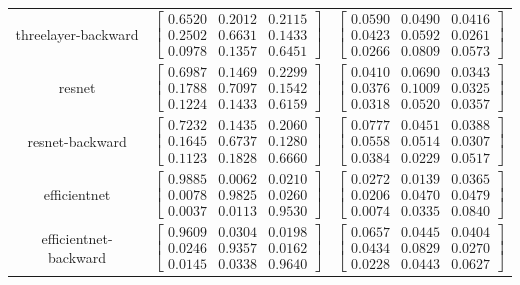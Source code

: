 \documentclass{article} %
\begin{document}
\begin{table}
\begin{tabular}{ccc}
threelayer-backward & $\begin{bmatrix}0.6520 & 0.2012 & 0.2115\\0.2502 & 0.6631 & 0.1433\\0.0978 & 0.1357 & 0.6451\end{bmatrix}$ & $\begin{bmatrix}0.0590 & 0.0490 & 0.0416\\0.0423 & 0.0592 & 0.0261\\0.0266 & 0.0809 & 0.0573\end{bmatrix}$\\
resnet & $\begin{bmatrix}0.6987 & 0.1469 & 0.2299\\0.1788 & 0.7097 & 0.1542\\0.1224 & 0.1433 & 0.6159\end{bmatrix}$ & $\begin{bmatrix}0.0410 & 0.0690 & 0.0343\\0.0376 & 0.1009 & 0.0325\\0.0318 & 0.0520 & 0.0357\end{bmatrix}$\\
resnet-backward & $\begin{bmatrix}0.7232 & 0.1435 & 0.2060\\0.1645 & 0.6737 & 0.1280\\0.1123 & 0.1828 & 0.6660\end{bmatrix}$ & $\begin{bmatrix}0.0777 & 0.0451 & 0.0388\\0.0558 & 0.0514 & 0.0307\\0.0384 & 0.0229 & 0.0517\end{bmatrix}$\\
efficientnet & $\begin{bmatrix}0.9885 & 0.0062 & 0.0210\\0.0078 & 0.9825 & 0.0260\\0.0037 & 0.0113 & 0.9530\end{bmatrix}$ & $\begin{bmatrix}0.0272 & 0.0139 & 0.0365\\0.0206 & 0.0470 & 0.0479\\0.0074 & 0.0335 & 0.0840\end{bmatrix}$\\
efficientnet-backward & $\begin{bmatrix}0.9609 & 0.0304 & 0.0198\\0.0246 & 0.9357 & 0.0162\\0.0145 & 0.0338 & 0.9640\end{bmatrix}$ & $\begin{bmatrix}0.0657 & 0.0445 & 0.0404\\0.0434 & 0.0829 & 0.0270\\0.0228 & 0.0443 & 0.0627\end{bmatrix}$\\

\end{tabular}
\end{table}
\end{document}
